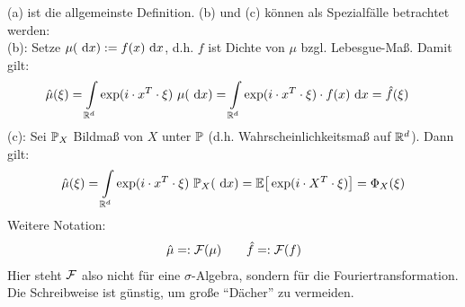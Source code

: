 \begin{bemerkung}
(a) ist die allgemeinste Definition. (b) und (c) können als Spezialfälle betrachtet werden:\\
(b): Setze $\mu(\d x):=f(x)\d x$, d.h. $f$ ist Dichte von $\mu$ bzgl. Lebesgue-Maß. Damit gilt:
\begin{align*}
\hat{\mu}(\xi)
&=\int\limits_{\R^d}\exp(i\cdot x^T\cdot\xi)~\mu(\d x)
=\int\limits_{\R^d}\exp(i\cdot x^T\cdot\xi)\cdot f(x)\d x=\hat{f}(\xi)
\end{align*}
(c): Sei $\P_X$ Bildmaß von $X$ unter $\P$ (d.h. Wahrscheinlichkeitsmaß auf $\R^d$). Dann gilt:
\begin{align*}
\hat{\mu}(\xi)=\int\limits_{\R^d}\exp(i\cdot x^T\cdot\xi)~\P_X(\d x)=\E\big[\exp(i\cdot X^T\cdot\xi)\big]
=\Phi_X(\xi)
\end{align*}
Weitere Notation: 
\begin{align*}
\hat{\mu}=:\F(\mu)\qquad\hat{f}=:\F(f)
\end{align*}
Hier steht $\F$ also nicht für eine $\sigma$-Algebra, sondern für die Fouriertransformation. Die Schreibweise ist günstig, um große ``Dächer'' zu vermeiden. 
\end{bemerkung}

